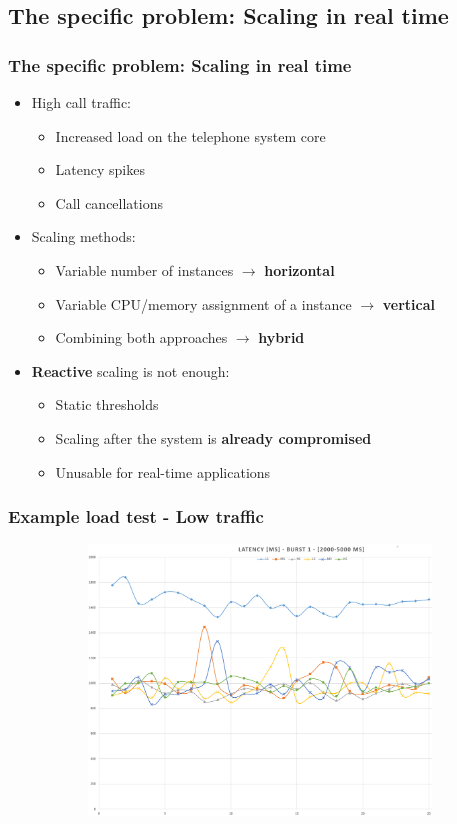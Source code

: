 \documentclass[11pt,t,usepdftitle=false,aspectratio=169]{beamer}
\begin{document}
\subsection{The specific problem: Scaling in real time}
\begin{frame}
	\frametitle{The specific problem: Scaling in {\color{uibkorange} real time}}
	
	\begin{itemize}
		\item High call traffic: 
		\begin{itemize}
			\item Increased load on the telephone system core
			\item Latency spikes
			\item Call cancellations
		\end{itemize}
	
		\item Scaling methods:
		\begin{itemize}
			\item Variable number of instances $\rightarrow$ \textbf{\color{uibkorange} horizontal}
			\item Variable CPU/memory assignment of a instance $\rightarrow$ \textbf{\color{uibkorange} vertical}
			\item Combining both approaches $\rightarrow$ \textbf{\color{uibkorange} hybrid}
		\end{itemize}
	
		\item \textbf{\color{uibkorange} Reactive} scaling is not enough:
		\begin{itemize}
			\item Static thresholds
			\item Scaling after the system is \textbf{\color{red} already compromised}
			\item Unusable for real-time applications
		\end{itemize}
	\end{itemize}
\end{frame}

\begin{frame}
	\frametitle{Example load test - Low traffic}
	
	\begin{figure}
		\centering
		\vspace*{-0.5cm}
		\includegraphics[width=13cm,height=7.2cm]{_images/load_low.png}
	\end{figure}
\end{frame}
\end{document}
